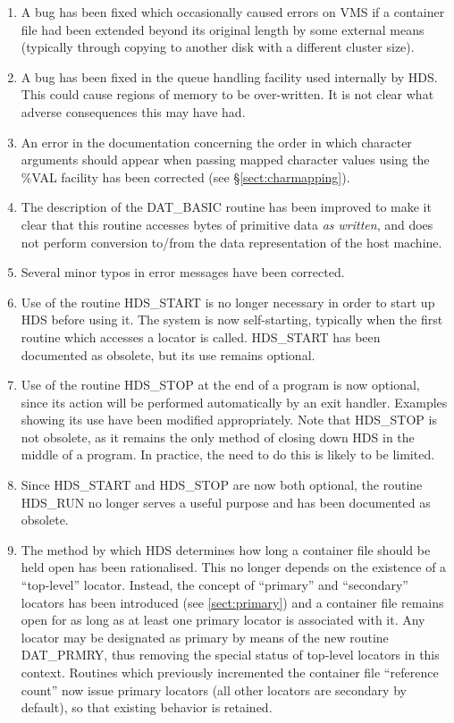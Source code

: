 \begin{enumerate}
\item
A bug has been fixed which occasionally caused errors on VMS if a container file
had been extended beyond its original length by some external means (typically
through copying to another disk with a different cluster size).

\item
A bug has been fixed in the queue handling facility used internally by HDS. This
could cause regions of memory to be over-written. It is not clear what adverse
consequences this may have had.

\item
An error in the documentation concerning the order in which character arguments
should appear when passing mapped character values using the \%VAL facility has
been corrected (see \S\ref{sect:charmapping}).

\item
The description of the DAT\_BASIC routine has been improved to make it clear
that this routine accesses bytes of primitive data {\em as written}, and does
not perform conversion to/from the data representation of the host machine.

\item
Several minor typos in error messages have been corrected.

\item
Use of the routine HDS\_START is no longer necessary in order to start up HDS
before using it. The system is now self-starting, typically when the first
routine which accesses a locator is called. HDS\_START has been documented as
obsolete, but its use remains optional.

\item
Use of the routine HDS\_STOP at the end of a program is now optional, since its
action will be performed automatically by an exit handler. Examples showing its
use have been modified appropriately. Note that HDS\_STOP is not obsolete, as it
remains the only method of closing down HDS in the middle of a program. In
practice, the need to do this is likely to be limited.

\item
Since HDS\_START and HDS\_STOP are now both optional, the routine HDS\_RUN no
longer serves a useful purpose and has been documented as obsolete.

\item
The method by which HDS determines how long a container file should be held open
has been rationalised. This no longer depends on the existence of a
``top-level'' locator. Instead, the concept of ``primary'' and ``secondary''
locators has been introduced (see \ref{sect:primary}) and a container file
remains open for as long as at least one primary locator is associated with it.
Any locator may be designated as primary by means of the new routine DAT\_PRMRY,
thus removing the special status of top-level locators in this context. Routines
which previously incremented the container file ``reference count'' now issue
primary locators (all other locators are secondary by default), so that existing
behavior is retained.


\end{enumerate}
